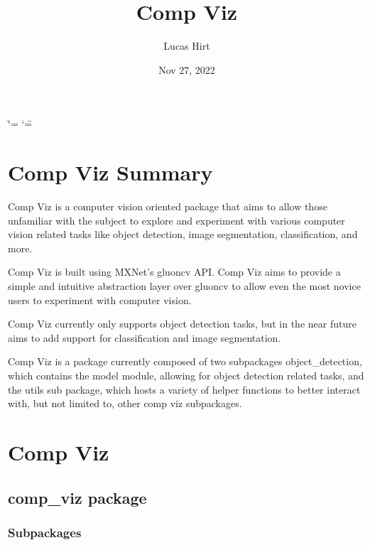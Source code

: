 \documentclass[letterpaper,10pt,english]{sphinxmanual}
\title{Comp Viz}
\date{Nov 27, 2022}
\author{Lucas Hirt}
\begin{document}
\ifdefined\shorthandoff
  \ifnum\catcode`\=\string=\active\shorthandoff{=}\fi
  \ifnum\catcode`\"=\active{}\fi
\fi

\pagestyle{empty}
\sphinxmaketitle
\pagestyle{plain}
\sphinxtableofcontents
\pagestyle{normal}
\label{\detokenize{index::doc}}


\sphinxstepscope


\chapter{Comp Viz Summary}
\label{\detokenize{summary:comp-viz-summary}}\label{\detokenize{summary::doc}}
\sphinxAtStartPar
Comp Viz is a computer vision oriented package that aims to allow those unfamiliar with the subject to
explore and experiment with various computer vision related tasks like object detection, image segmentation,
classification, and more.

\sphinxAtStartPar
Comp Viz is built using MXNet’s gluoncv API. Comp Viz aims to provide a simple and intuitive abstraction
layer over gluoncv to allow even the most novice users to experiment with computer vision.

\sphinxAtStartPar
Comp Viz currently only supports object detection tasks, but in the near future aims to add support for
classification and image segmentation.

\sphinxAtStartPar
Comp Viz is a package currently composed of two subpackages\sphinxhyphen{} object\_detection, which contains the model module,
allowing for object detection related tasks, and the utils sub package, which hosts a variety of helper
functions to better interact with, but not limited to, other comp viz subpackages.

\sphinxstepscope


\chapter{Comp Viz}
\label{\detokenize{modules:comp-viz}}\label{\detokenize{modules::doc}}
\sphinxstepscope


\section{comp\_viz package}
\label{\detokenize{comp_viz:comp-viz-package}}\label{\detokenize{comp_viz::doc}}

\subsection{Subpackages}
\label{\detokenize{comp_viz:subpackages}}
\sphinxstepscope
\end{document}
